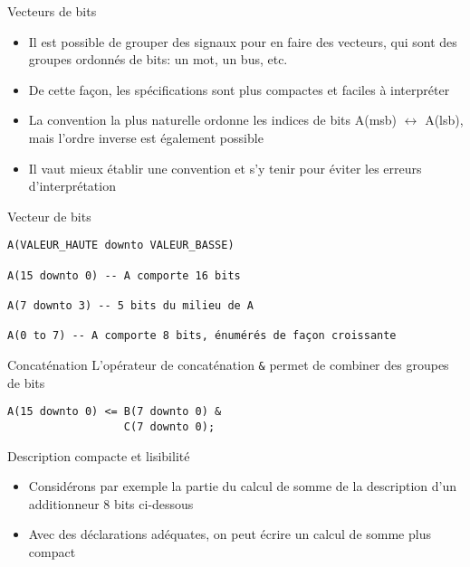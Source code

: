\documentclass[presentation]{beamer}
\begin{document}
\begin{frame}[label={sec:org524faad}]{Vecteurs de bits}
\begin{itemize}
\item Il est possible de grouper des signaux pour en faire des vecteurs, qui sont des groupes ordonnés de bits: un mot, un bus, etc.
\item De cette façon, les spécifications sont plus compactes et faciles à interpréter
\item La convention la plus naturelle ordonne les indices de bits 
A(msb) \(\longleftrightarrow\) A(lsb), mais l'ordre inverse est également possible
\item Il vaut mieux établir une convention et s'y tenir pour éviter les erreurs d'interprétation
\end{itemize}
\end{frame}

\begin{frame}[label={sec:org148c55a},fragile]{Vecteur de bits}
 \begin{verbatim}
A(VALEUR_HAUTE downto VALEUR_BASSE)

A(15 downto 0) -- A comporte 16 bits

A(7 downto 3) -- 5 bits du milieu de A

A(0 to 7) -- A comporte 8 bits, énumérés de façon croissante
\end{verbatim}
\end{frame}


\begin{frame}[label={sec:org5d97f10},fragile]{Concaténation}
 L'opérateur de concaténation \texttt{\&} permet de combiner des groupes de bits

\begin{verbatim}
A(15 downto 0) <= B(7 downto 0) &
                  C(7 downto 0);
\end{verbatim}
\end{frame}

\begin{frame}[label={sec:orge3ddc24}]{Description compacte et lisibilité}
\begin{itemize}
\item Considérons par exemple la partie du calcul de somme de la description d'un additionneur 8 bits ci-dessous
\item Avec des déclarations adéquates, on peut écrire un calcul de somme plus compact
\end{itemize}
\end{frame}
\end{document}
